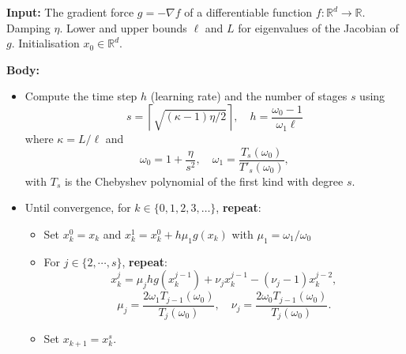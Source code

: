 \documentclass[10pt,a4paper]{article}
\begin{document}
\begin{algorithm} [t]
\caption{{\cite{EVVZ21}} Runge-Kutta Chebyshev descent method (RKCD)} 


\textbf{Input:}
The gradient force $g=-\nabla f$ of a differentiable function $f:\mathbb{R}^d\rightarrow\mathbb{R}$.
Damping $\eta$. Lower and upper bounds $\ell$ and $L$ for eigenvalues of the Jacobian of $g$.  Initialisation $x_0\in\mathbb{R}^d$. 




\textbf{Body:} 
\begin{itemize}
  \item Compute the time step $h$ (learning rate) and the number of stages $s$ using 
  \begin{equation}  \label{eq:defn of parameters1}
  s=\left\lceil\sqrt{(\kappa-1)\eta/2}\right\rceil,\quad h=\frac{\omega_0-1}{\omega_1\ell}
  \end{equation}
  where $\kappa=L/\ell$  and
\begin{equation}\label{eq:defn of parameters}
\omega_{0}=1+\frac{\eta}{s^{2}}, \quad \omega_{1}
=\frac{T_{s}(\omega_{0})}{T'_{s}(\omega_{0})},
\end{equation}
with $T_s$ is the Chebyshev polynomial of the first kind with degree $s$. 
\item Until convergence, for $k\in \{0,1,2,3,\ldots\}$, \textbf{repeat}:
\begin{itemize}
\item Set $x_k^0 = x_k$ and $x_k^1 = x_k^0 + h\mu_1 g(x_k)$ with $\mu_1 = \omega_1/ \omega_0$
\item For $j\in \{2,\cdots,s\}$, \textbf{repeat}:
$$x_k^j = \mu_j h g(x_k^{j-1}) + \nu_j x_{k}^{j-1}-(\nu_j-1) x_{k}^{j-2},$$ 
\[
\mu_j = \frac{2\omega_1 T_{j-1}(\omega_0)}{T_j(\omega_0)},
\quad \nu_j = \frac{2\omega_0 T_{j-1}(\omega_0)}{T_j(\omega_0)}.
\]
\item Set $x_{k+1}=x_{k}^s$. 
\end{itemize}
\end{itemize}


\end{algorithm}
\end{document}
